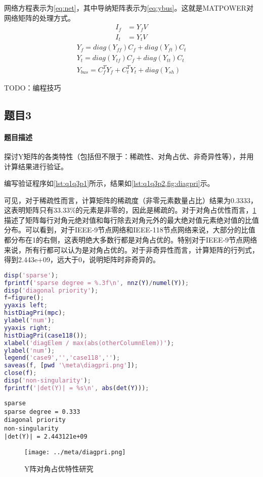 \documentclass[a4paper,12pt]{article}
\begin{document}
    网络方程表示为\cref{eq:net}，其中导纳矩阵表示为\cref{eq:ybus}。这就是MATPOWER对网络矩阵的处理方式。
    \begin{equation}
      \label{eq:net}
      \begin{aligned}
        I_f &= Y_f V \\
        I_t &= Y_t V
      \end{aligned}
    \end{equation}
    \begin{equation}
      \label{eq:ybus}
      \begin{aligned}
          Y_f = diag(Y_{ff})C_f+diag(Y_{ft})C_t\\
          Y_t = diag(Y_{tf})C_f+diag(Y_{tt})C_t\\
          Y_{bus} = C_f^TY_f+C_t^TY_t+diag(Y_{sh})
      \end{aligned}
    \end{equation}

    TODO：编程技巧
    \subsection{题目3}
    \paragraph{题目描述} 探讨Y矩阵的各类特性（包括但不限于：稀疏性、对角占优、非奇异性等），并用计算结果进行验证。

    编写验证程序如\cref{lst:q1q3p1}所示，结果如\cref{lst:q1q3p2,fig:diagpri}示。

    可见，对于稀疏性而言，计算矩阵的稀疏度（非零元素数量占比）结果为0.3333，这表明矩阵只有33.33\%的元素是非零的，因此是稀疏的。对于对角占优性而言，\cref{fig:diagpri}描述了矩阵每行对角元绝对值和每行除去对角元外的最大绝对值元素绝对值的比值分布。可以看到，对于IEEE-9节点网络和IEEE-118节点网络来说，大部分的比值都分布在1的右侧，这表明绝大多数行都是对角占优的。特别对于IEEE-9节点网络来说，所有行都可以认为是对角占优的。对于非奇异性而言，计算矩阵的行列式，得到2.443e+09，远大于0，说明矩阵时非奇异的。

    \begin{lstlisting}[language=matlab,label=lst:q1q3p1,caption={矩阵特性验证程序}]
%% feature of Y
disp('sparse');
fprintf('sparse degree = %.3f\n', nnz(Y)/numel(Y));
disp('diagonal priority');
f=figure();
yyaxis left;
histDiagPri(mpc);
ylabel('num');
yyaxis right;
histDiagPri(case118());
xlabel('diagElem / max(abs(otherColumnElem))');
ylabel('num');
legend('case9','','case118','');
saveas(f, [pwd '\meta\diagpri.png']);
close(f);
disp('non-singularity');
fprintf('|det(Y)| = %s\n', abs(det(Y)));
    \end{lstlisting}
    \begin{lstlisting}[label=lst:q1q3p2,caption={矩阵特性验证结果}]
sparse
sparse degree = 0.333
diagonal priority
non-singularity
|det(Y)| = 2.443121e+09
    \end{lstlisting}
    \begin{figure}
      \texttt{[image: ../meta/diagpri.png]}
      \caption{Y阵对角占优特性研究}
      \label{fig:diagpri}
    \end{figure}
\end{document}
